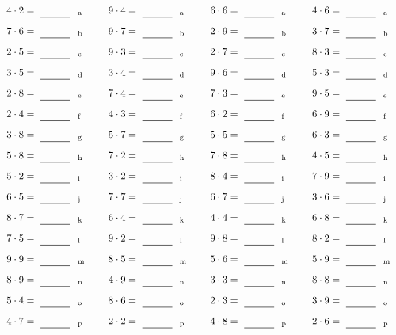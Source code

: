 \documentclass
[
  draft    = true,
  fontsize = 11pt,
  parskip  = half-
]
{scrartcl}
\begin{document}
\par\vfill\par
\begin{align*}
    \pline{4\cdot2}&=\rline{a}
  & \pline{9\cdot4}&=\rline{a}
  & \pline{6\cdot6}&=\rline{a}
  & \pline{4\cdot6}&=\rline{a} \\[1ex]
    \pline{7\cdot6}&=\rline{b}
  & \pline{9\cdot7}&=\rline{b}
  & \pline{2\cdot9}&=\rline{b}
  & \pline{3\cdot7}&=\rline{b} \\[1ex]
    \pline{2\cdot5}&=\rline{c}
  & \pline{9\cdot3}&=\rline{c}
  & \pline{2\cdot7}&=\rline{c}
  & \pline{8\cdot3}&=\rline{c} \\[1ex]
    \pline{3\cdot5}&=\rline{d}
  & \pline{3\cdot4}&=\rline{d}
  & \pline{9\cdot6}&=\rline{d}
  & \pline{5\cdot3}&=\rline{d} \\[1ex]
    \pline{2\cdot8}&=\rline{e}
  & \pline{7\cdot4}&=\rline{e}
  & \pline{7\cdot3}&=\rline{e}
  & \pline{9\cdot5}&=\rline{e} \\[1ex]
    \pline{2\cdot4}&=\rline{f}
  & \pline{4\cdot3}&=\rline{f}
  & \pline{6\cdot2}&=\rline{f}
  & \pline{6\cdot9}&=\rline{f} \\[1ex]
    \pline{3\cdot8}&=\rline{g}
  & \pline{5\cdot7}&=\rline{g}
  & \pline{5\cdot5}&=\rline{g}
  & \pline{6\cdot3}&=\rline{g} \\[1ex]
    \pline{5\cdot8}&=\rline{h}
  & \pline{7\cdot2}&=\rline{h}
  & \pline{7\cdot8}&=\rline{h}
  & \pline{4\cdot5}&=\rline{h} \\[1ex]
    \pline{5\cdot2}&=\rline{i}
  & \pline{3\cdot2}&=\rline{i}
  & \pline{8\cdot4}&=\rline{i}
  & \pline{7\cdot9}&=\rline{i} \\[1ex]
    \pline{6\cdot5}&=\rline{j}
  & \pline{7\cdot7}&=\rline{j}
  & \pline{6\cdot7}&=\rline{j}
  & \pline{3\cdot6}&=\rline{j} \\[1ex]
    \pline{8\cdot7}&=\rline{k}
  & \pline{6\cdot4}&=\rline{k}
  & \pline{4\cdot4}&=\rline{k}
  & \pline{6\cdot8}&=\rline{k} \\[1ex]
    \pline{7\cdot5}&=\rline{l}
  & \pline{9\cdot2}&=\rline{l}
  & \pline{9\cdot8}&=\rline{l}
  & \pline{8\cdot2}&=\rline{l} \\[1ex]
    \pline{9\cdot9}&=\rline{m}
  & \pline{8\cdot5}&=\rline{m}
  & \pline{5\cdot6}&=\rline{m}
  & \pline{5\cdot9}&=\rline{m} \\[1ex]
    \pline{8\cdot9}&=\rline{n}
  & \pline{4\cdot9}&=\rline{n}
  & \pline{3\cdot3}&=\rline{n}
  & \pline{8\cdot8}&=\rline{n} \\[1ex]
    \pline{5\cdot4}&=\rline{o}
  & \pline{8\cdot6}&=\rline{o}
  & \pline{2\cdot3}&=\rline{o}
  & \pline{3\cdot9}&=\rline{o} \\[1ex]
    \pline{4\cdot7}&=\rline{p}
  & \pline{2\cdot2}&=\rline{p}
  & \pline{4\cdot8}&=\rline{p}
  & \pline{2\cdot6}&=\rline{p}
\end{align*}
\end{document}
